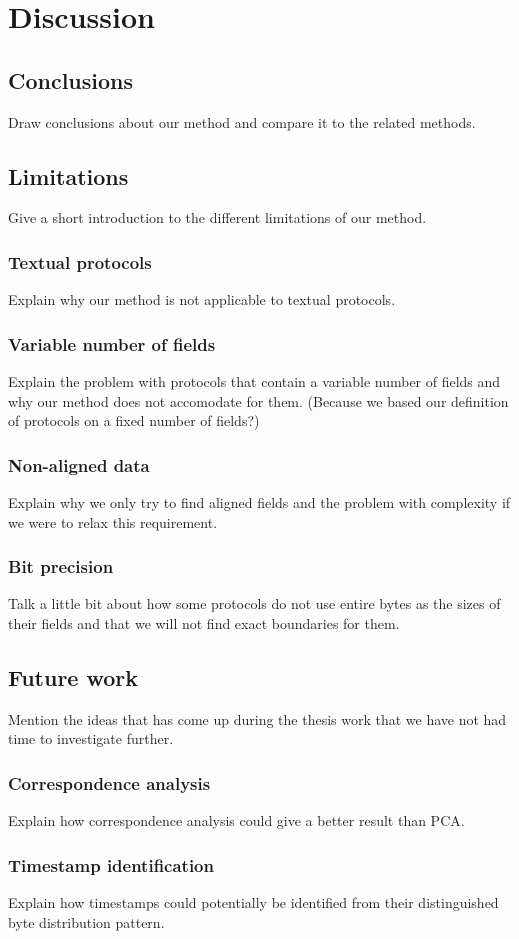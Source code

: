 \documentclass[a4paper]{report}
\begin{document}
\chapter{Discussion}

\section{Conclusions}
Draw conclusions about our method and compare it to the related methods.

\section{Limitations}
Give a short introduction to the different limitations of our method.

\subsection{Textual protocols}
Explain why our method is not applicable to textual protocols.

\subsection{Variable number of fields}
Explain the problem with protocols that contain a variable number of fields and
why our method does not accomodate for them. (Because we based our definition
of protocols on a fixed number of fields?)

\subsection{Non-aligned data}
Explain why we only try to find aligned fields and the problem with complexity
if we were to relax this requirement.

\subsection{Bit precision}
Talk a little bit about how some protocols do not use entire bytes as the sizes
of their fields and that we will not find exact boundaries for them.

\section{Future work}
Mention the ideas that has come up during the thesis work that we have not had
time to investigate further.

\subsection{Correspondence analysis}
Explain how correspondence analysis could give a better result than PCA.

\subsection{Timestamp identification}
Explain how timestamps could potentially be identified from their distinguished
byte distribution pattern.



\end{document}
